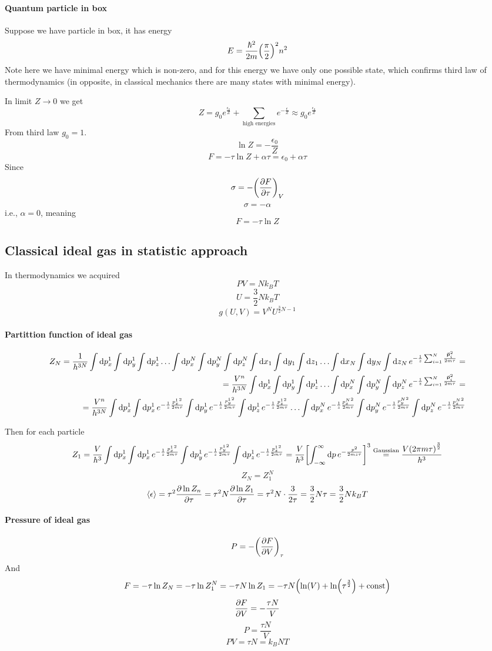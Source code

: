 \paragraph{Quantum particle in box}
Suppose we have particle in box, it has energy
$$E=\frac{\hbar^2}{2m} \qty(\frac{\pi}{2})^2 n^2$$
Note here we have minimal energy which is non-zero, and for this energy we have only one possible state, which confirms third law of thermodynamics (in opposite, in classical mechanics there are many states with minimal energy).

In limit $Z\to 0$ we get
$$Z = g_0e^{\frac{\epsilon_0}{Z}} +\sum_{\text{high energies}} e^{-\frac{\epsilon}{Z}} \approx  g_0e^{\frac{\epsilon_0}{Z}}$$
From third law $g_0=1$.
$$\ln Z = -\frac{\epsilon_0}{Z}$$
$$F = -\tau \ln Z + \alpha \tau = \epsilon_0 +\alpha \tau$$
Since 
$$\sigma = -\qty(\pdv{F}{\tau})_V$$
$$\sigma=-\alpha$$
i.e., $\alpha = 0$, meaning
$$F= -\tau \ln Z$$
\subsection{Classical ideal gas in statistic approach}
In thermodynamics we acquired 
$$PV=Nk_BT$$
$$U=\frac{3}{2} Nk_BT$$
$$g(U,V) =V^N U^{\frac{3}{2}N-1}$$
\paragraph{Partittion function of ideal gas}
\begin{align*}
	Z_N = \frac{1}{h^{3N}} \int \dd{p_x^1} \int \dd{p_y^1} \int \dd{p_z^1} \dots  \int \dd{p_x^N} \int \dd{p_y^N} \int \dd{p_z^N} \int \dd{x_1} \int \dd{y_1} \int \dd{z_1} \dots  \int \dd{x_N} \int \dd{y_N} \int \dd{z_N} e^{-\frac{1}{z} \sum_{i=1}^N \frac{\va{p}_i^2}{2m\tau}} =\\=
	\frac{V^n}{h^{3N}} \int \dd{p_x^1} \int \dd{p_y^1} \int \dd{p_z^1} \dots  \int \dd{p_x^N} \int \dd{p_y^N} \int \dd{p_z^N} e^{-\frac{1}{z} \sum_{i=1}^N \frac{\va{p}_i^2}{2m\tau}} =\\=
	\frac{V^n}{h^{3N}} \int \dd{p_x^1} \int \dd{p_x^1} e^{-\frac{1}{z} \frac{{p_x^1}^2}{2m\tau}} \int \dd{p_y^1} e^{-\frac{1}{z} \frac{{p_y^1}^2}{2m\tau}} \int \dd{p_z^1} e^{-\frac{1}{z} \frac{{p_z^1}^2}{2m\tau}} \dots  \int \dd{p_x^N} e^{-\frac{1}{z} \frac{{p_x^N}^2}{2m\tau}} \int \dd{p_y^N} e^{-\frac{1}{z} \frac{{p_y^N}^2}{2m\tau}} \int \dd{p_z^N} e^{-\frac{1}{z} \frac{{p_z^N}^2}{2m\tau}}
\end{align*}

Then for each particle
$$Z_1 = \frac{V}{h^{3}} \int \dd{p_x^1}  \int \dd{p_x^1} e^{-\frac{1}{z} \frac{{p_x^1}^2}{2m\tau}} \int \dd{p_y^1} e^{-\frac{1}{z} \frac{{p_y^1}^2}{2m\tau}} \int \dd{p_z^1} e^{-\frac{1}{z} \frac{{p_z^1}^2}{2m\tau}} = \frac{V}{h^{3}} \qty[\int_{-\infty}^\infty \dd{p} e^{- \frac{p^2}{2mz\tau}}]^3 \stackrel{\text{Gaussian}}{=}  \frac{V\qty(2\pi m \tau )^{\frac{3}{2}}}{h^{3}}$$
$$Z_N = Z_1^N$$
$$\expval{\epsilon} = \tau^2 \pdv{\ln Z_n}{\tau} = \tau^2 N \pdv{\ln Z_1}{\tau} = \tau^2 N \cdot \frac{3}{2\tau} = \frac{3}{2} N\tau = \frac{3}{2} Nk_BT$$
\paragraph{Pressure of ideal gas}
$$P = -\qty(\pdv{F}{V})_\tau $$
And
$$F = -\tau \ln Z_N = -\tau \ln Z_1^N = -\tau N \ln Z_1 = -\tau N \qty(\ln(V) + \ln (\tau^{\frac{3}{2}}) + \text{const})$$
$$\pdv{F}{V} = -\frac{\tau N}{V}$$
$$P = \frac{\tau N}{V}$$
$$PV = \tau N = k_B NT$$